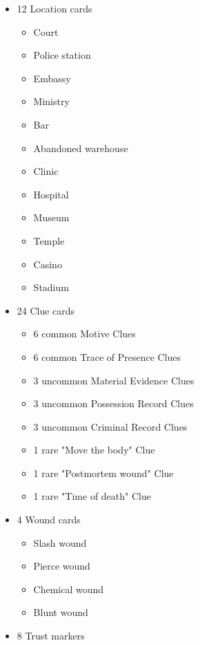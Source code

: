 \documentclass[a4paper, 11pt]{article}
\begin{document}
\begin{itemize}
\begin{itemize}
		\end{itemize}

	\item 12 Location cards
		\begin{itemize}

		\item Court
		\item Police station
		\item Embassy
		\item Ministry
		\item Bar
		\item Abandoned warehouse
		\item Clinic
		\item Hospital
		\item Museum
		\item Temple
		\item Casino
		\item Stadium

		\end{itemize}

	\item 24 Clue cards
		\begin{itemize}

		\item 6 common Motive Clues
		\item 6 common Trace of Presence Clues
		\item 3 uncommon Material Evidence Clues
		\item 3 uncommon Possession Record Clues
		\item 3 uncommon Criminal Record Clues
		\item 1 rare "Move the body" Clue
		\item 1 rare "Postmortem wound" Clue
		\item 1 rare "Time of death" Clue

		\end{itemize}

	\item 4 Wound cards
		\begin{itemize}

		\item Slash wound
		\item Pierce wound
		\item Chemical wound
		\item Blunt wound

		\end{itemize}

	\item 8 Trust markers

	\end{itemize}
\end{document}
